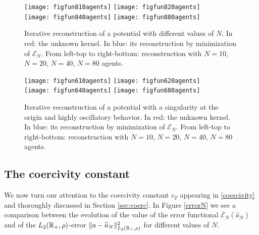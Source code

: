 \begin{figure}[h!]
\begin{center}
\texttt{[image: figfun810agents]}
\texttt{[image: figfun820agents]}\\
\texttt{[image: figfun840agents]}
\texttt{[image: figfun880agents]}
\end{center}
\caption{Iterative reconstruction of a potential with different values of $N$. In red: the unknown kernel. In blue: its reconstruction by minimization of $\mathcal{E}_N$. From left-top to right-bottom: reconstruction with $N = 10$, $N = 20$, $N = 40$, $N = 80$ agents.}\label{variableN}
\end{figure}

\begin{figure}[h!]
\begin{center}
\texttt{[image: figfun610agents]}
\texttt{[image: figfun620agents]}\\
\texttt{[image: figfun640agents]}
\texttt{[image: figfun680agents]}
\end{center}
\caption{Iterative reconstruction of a potential with a singularity at the origin and highly oscillatory behavior. In red: the unknown kernel. In blue: its reconstruction by minimization of $\mathcal{E}_N$. From left-top to right-bottom: reconstruction with $N = 10$, $N = 20$, $N = 40$, $N = 80$ agents.}\label{variableN2}
\end{figure}

\subsection{The coercivity constant}

We now turn our attention to the coercivity constant $c_T$ appearing in \eqref{coercivity} and thoroughly discussed in Section \ref{sec:coerc}. In Figure \ref{errorN} we see a comparison between the evolution of the value of the error functional $\overline{\mathcal{E}}_N(\widehat{a}_N)$ and of the $L_2(\mathbb{R}_+,\rho)$-error $\|a-\widehat{a}_N\|^2_{L_2(\mathbb{R}_+,\rho)}$ for different values of $N$. 

